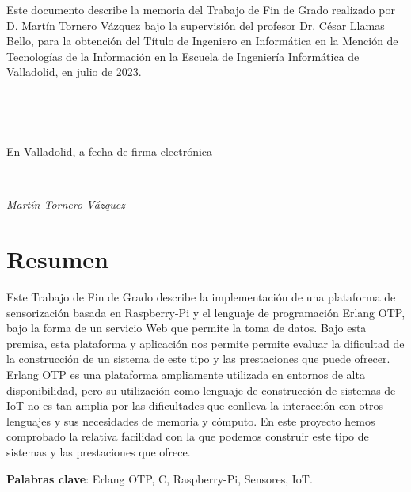 \documentclass[openright,twoside,12pt]{book}
\begin{document}
\thispagestyle{empty}

\vspace*{12cm}

\begin{minipage}{12cm}
\large
Este documento describe la memoria del Trabajo de Fin de Grado realizado por D. Martín Tornero Vázquez bajo la supervisión del profesor Dr. César Llamas Bello, para la obtención del Título de Ingeniero en Informática en la Mención de Tecnologías de la Información en la Escuela de Ingeniería Informática de Valladolid, en julio de 2023. 

\ \newline



\ \newline


En Valladolid, a fecha de firma electrónica

\ \newline


\emph{Martín Tornero Vázquez}
\end{minipage}

\newpage
\chapter*{Resumen}
\begin{center}
    \begin{minipage}[h]{0.8\textwidth}

Este Trabajo de Fin de Grado describe la implementación de una plataforma de sensorización basada en Raspberry-Pi y el lenguaje de programación Erlang OTP, bajo la forma de un servicio Web que permite la toma de datos. Bajo esta premisa, esta plataforma y aplicación nos permite  permite evaluar la dificultad de la construcción de un sistema de este tipo y las prestaciones que puede ofrecer.\\

Erlang OTP es una plataforma ampliamente utilizada en entornos de alta disponibilidad, pero su utilización como lenguaje de construcción de sistemas de IoT no es tan amplia por las dificultades que conlleva la interacción con otros lenguajes y sus necesidades de memoria y cómputo. En este proyecto hemos comprobado la relativa facilidad con la que podemos construir este tipo de sistemas y las prestaciones que ofrece.

\parskip 1cm

\textbf{Palabras clave}: Erlang OTP, C, Raspberry-Pi, Sensores, IoT.
  \end{minipage}
\end{center}
\end{document}
